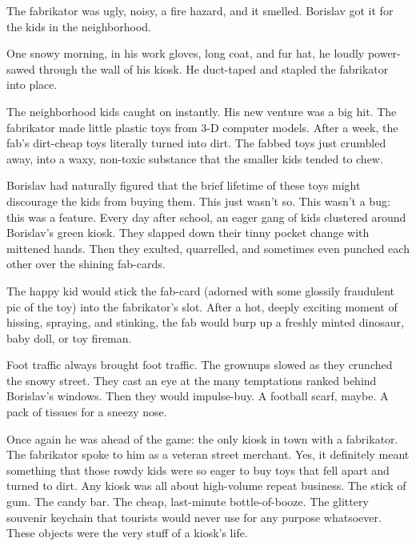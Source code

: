 \documentclass[20 pt,twoside,extrafontsizes,final]{memoir}
\begin{document}
\normalsize The fabrikator was ugly, noisy, a fire hazard, and it smelled. Borislav got it for the kids in the neighborhood.

One snowy morning, in his work gloves, long coat, and fur hat, he loudly power-sawed through the wall of his kiosk. He duct-taped and stapled the fabrikator into place.
 
The neighborhood kids caught on instantly. His new venture was a big hit. The fabrikator made little plastic toys from 3-D computer models. After a week, the fab's dirt-cheap toys literally turned into dirt. The fabbed toys just crumbled away, into a waxy, non-toxic substance that the smaller kids tended to chew.

Borislav had naturally figured that the brief lifetime of these toys might discourage the kids from buying them. This just wasn't so. This wasn't a bug: this was a feature. Every day after school, an eager gang of kids clustered around Borislav's green kiosk. They slapped down their tinny pocket change with mittened hands. Then they exulted, quarrelled, and sometimes even punched each other over the shining fab-cards.

The happy kid would stick the fab-card (adorned with some glossily fraudulent pic of the toy) into the fabrikator's slot. After a hot, deeply exciting moment of hissing, spraying, and stinking, the fab would burp up a freshly minted dinosaur, baby doll, or toy fireman.

Foot traffic always brought foot traffic. The grownups slowed as they crunched the snowy street. They cast an eye at the many temptations ranked behind Borislav's windows. Then they would impulse-buy. A football scarf, maybe. A pack of tissues for a sneezy nose.

Once again he was ahead of the game: the only kiosk in town with a fabrikator. The fabrikator spoke to him as a veteran street merchant. Yes, it definitely meant something that those rowdy kids were so eager to buy toys that fell apart and turned to dirt. Any kiosk was all about high-volume repeat business. The stick of gum. The candy bar. The cheap, last-minute bottle-of-booze. The glittery souvenir keychain that tourists would never use for any purpose whatsoever. These objects were the very stuff of a kiosk's life.
\end{document}
